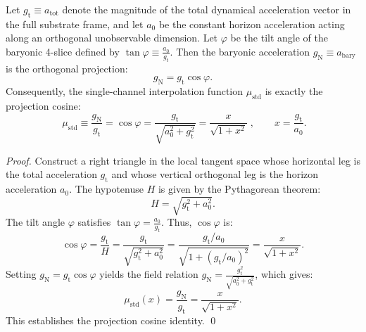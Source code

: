 \documentclass[11pt,a4paper]{article}
\theoremstyle{definition}
\begin{document}
\begin{theorem}
\label{thm:projection_cosine}
Let $g_{\text{t}} \equiv a_{\text{tot}}$ denote the magnitude of the total dynamical acceleration vector in the full substrate frame, and let $a_0$ be the constant horizon acceleration acting along an orthogonal unobservable dimension. Let $\varphi$ be the tilt angle of the baryonic 4-slice defined by $\tan\varphi \equiv \frac{a_0}{g_{\text{t}}}$. Then the baryonic acceleration $g_{\text{N}} \equiv a_{\text{bary}}$ is the orthogonal projection:
\begin{equation}
g_{\text{N}} = g_{\text{t}} \cos\varphi.
\end{equation}
Consequently, the single-channel interpolation function $\mu_{\text{std}}$ is exactly the projection cosine:
\begin{equation}
\boxed{\;\mu_{\text{std}} \equiv \frac{g_{\text{N}}}{g_{\text{t}}} = \cos\varphi = \frac{g_{\text{t}}}{\sqrt{a_0^2 + g_{\text{t}}^2}} = \frac{x}{\sqrt{1+x^2}}\;}, \qquad x = \frac{g_{\text{t}}}{a_0}.
\label{eq:projection_cosine_identity}
\end{equation}
\end{theorem}

\begin{proof}
Construct a right triangle in the local tangent space whose horizontal leg is the total acceleration $g_{\text{t}}$ and whose vertical orthogonal leg is the horizon acceleration $a_0$. The hypotenuse $H$ is given by the Pythagorean theorem:
\begin{equation}
H = \sqrt{g_{\text{t}}^2 + a_0^2}.
\end{equation}
The tilt angle $\varphi$ satisfies $\tan\varphi = \frac{a_0}{g_{\text{t}}}$. Thus, $\cos\varphi$ is:
\begin{equation}
\cos\varphi = \frac{g_{\text{t}}}{H} = \frac{g_{\text{t}}}{\sqrt{g_{\text{t}}^2 + a_0^2}} = \frac{g_{\text{t}}/a_0}{\sqrt{1 + (g_{\text{t}}/a_0)^2}} = \frac{x}{\sqrt{1+x^2}}.
\end{equation}
Setting $g_{\text{N}} = g_{\text{t}} \cos\varphi$ yields the field relation $g_{\text{N}} = \frac{g_{\text{t}}^2}{\sqrt{a_0^2 + g_{\text{t}}^2}}$, which gives:
\begin{equation}
\mu_{\text{std}}(x) = \frac{g_{\text{N}}}{g_{\text{t}}} = \frac{x}{\sqrt{1+x^2}}.
\end{equation}
This establishes the projection cosine identity. \qed
\end{proof}
\end{document}
